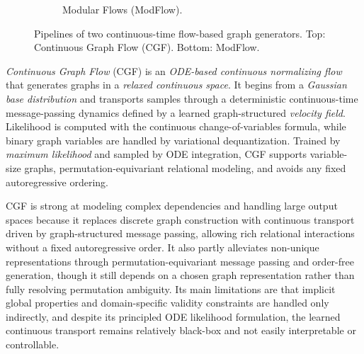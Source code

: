 \documentclass{article}
\begin{document}
\begin{figure}[htbp]
\begin{subfigure}[t]{\textwidth}
\caption{Modular Flows (ModFlow).}
\end{subfigure}

\caption{Pipelines of two continuous-time flow-based graph generators. Top: Continuous Graph Flow (CGF). Bottom: ModFlow.}
\label{fig:cgf_modflow_pipelines}
\end{figure}
\emph{Continuous Graph Flow} (CGF) \cite{deng2019continuous} is an \emph{ODE-based continuous normalizing flow} that generates graphs in a \emph{relaxed continuous space}. It begins from a \emph{Gaussian base distribution} and transports samples through a deterministic continuous-time message-passing dynamics defined by a learned graph-structured \emph{velocity field}. Likelihood is computed with the continuous change-of-variables formula, while binary graph variables are handled by variational dequantization. Trained by \emph{maximum likelihood} and sampled by ODE integration, CGF supports variable-size graphs, permutation-equivariant relational modeling, and avoids any fixed autoregressive ordering.

CGF is strong at modeling complex dependencies and handling large output spaces because it replaces discrete graph construction with continuous transport driven by graph-structured message passing, allowing rich relational interactions without a fixed autoregressive order. It also partly alleviates non-unique representations through permutation-equivariant message passing and order-free generation, though it still depends on a chosen graph representation rather than fully resolving permutation ambiguity. Its main limitations are that implicit global properties and domain-specific validity constraints are handled only indirectly, and despite its principled ODE likelihood formulation, the learned continuous transport remains relatively black-box and not easily interpretable or controllable.
\end{document}
